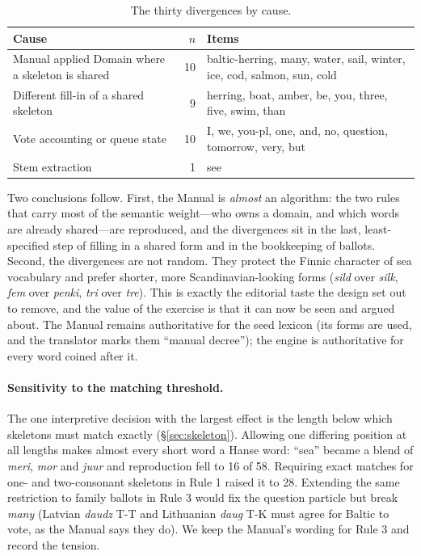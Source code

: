 \begin{table}[t]
\centering\small
\caption{The thirty divergences by cause.}
\label{tab:divergence}
\begin{tabular}{@{}p{3.1cm}rp{3.7cm}@{}}
\toprule
Cause & $n$ & Items \\
\midrule
Manual applied Domain where a skeleton is shared & 10 & baltic-herring, many, water, sail, winter, ice, cod, salmon, sun, cold \\
Different fill-in of a shared skeleton & 9 & herring, boat, amber, be, you, three, five, swim, than \\
Vote accounting or queue state & 10 & I, we, you-pl, one, and, no, question, tomorrow, very, but \\
Stem extraction & 1 & see \\
\bottomrule
\end{tabular}
\end{table}

Two conclusions follow. First, the Manual is \emph{almost} an algorithm: the two rules that carry most of the semantic weight---who owns a domain, and which words are already shared---are reproduced, and the divergences sit in the last, least-specified step of filling in a shared form and in the bookkeeping of ballots. Second, the divergences are not random. They protect the Finnic character of sea vocabulary and prefer shorter, more Scandinavian-looking forms (\emph{sild} over \emph{silk}, \emph{fem} over \emph{penki}, \emph{tri} over \emph{tre}). This is exactly the editorial taste the design set out to remove, and the value of the exercise is that it can now be seen and argued about. The Manual remains authoritative for the seed lexicon (its forms are used, and the translator marks them ``manual decree''); the engine is authoritative for every word coined after it.

\paragraph{Sensitivity to the matching threshold.} The one interpretive decision with the largest effect is the length below which skeletons must match exactly (\S\ref{sec:skeleton}). Allowing one differing position at all lengths makes almost every short word a Hanse word: ``sea'' became a blend of \emph{meri}, \emph{mor} and \emph{juur} and reproduction fell to 16 of 58. Requiring exact matches for one- and two-consonant skeletons in Rule 1 raised it to 28. Extending the same restriction to family ballots in Rule 3 would fix the question particle but break \emph{many} (Latvian \emph{daudz} T-T and Lithuanian \emph{daug} T-K must agree for Baltic to vote, as the Manual says they do). We keep the Manual's wording for Rule 3 and record the tension.

